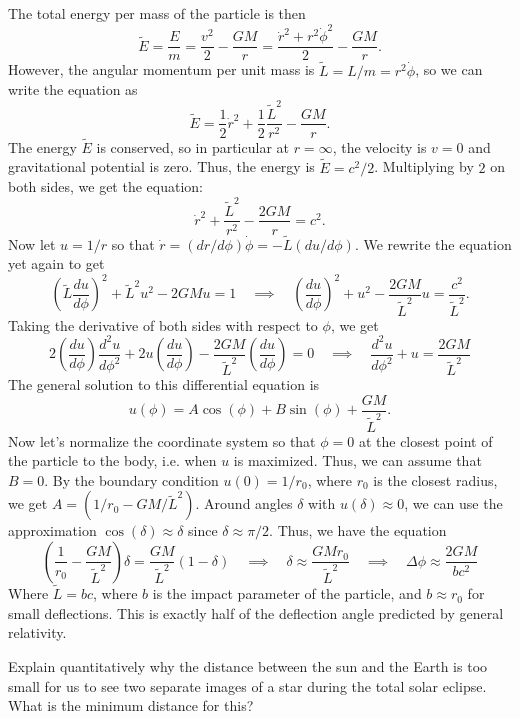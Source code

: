 \documentclass{../../templates/lkx_pset}
\begin{document}
\begin{solution}
  The total energy per mass of the particle is then 
  \[
    \widetilde{E} = \frac{E}{m} = \frac{v^2}{2} - \frac{GM}{r} = \frac{\dot{r}^2+ r^2\dot{\phi}^2}{2} - \frac{GM}{r}.
  \]
  However, the angular momentum per unit mass is $\widetilde{L} = L/m = r^2\dot{\phi}$, so we can write the equation as
  \[
    \widetilde{E} = \frac{1}{2}\dot{r}^2 + \frac{1}{2}\frac{\widetilde{L}^2}{r^2} - \frac{GM}{r}.
  \]
  The energy $\widetilde{E}$ is conserved, so in particular at $r=\infty$, the velocity is $v=0$ and gravitational potential is zero. Thus, the energy is $\widetilde{E}=c^2/2$. Multiplying by $2$ on both sides, we get the equation:
  \[
    \dot{r}^2 + \frac{\widetilde{L}^2}{r^2} - \frac{2GM}{r} = c^2.
  \]
  Now let $u=1/r$ so that $\dot{r} = (dr/d\phi)\dot{\phi} = -\widetilde{L}(du/d\phi)$. We rewrite the equation yet again to get
  \[
    \left(\widetilde{L}\frac{du}{d\phi}\right)^2 + \widetilde{L}^2u^2-2GMu = 1\quad\implies\quad
    \left(\frac{du}{d\phi}\right)^2 + u^2 - \frac{2GM}{\widetilde{L}^2}u = \frac{c^2}{\widetilde{L}^2}.
  \]
  Taking the derivative of both sides with respect to $\phi$, we get
  \[
    2\left(\frac{du}{d\phi}\right)\frac{d^2u}{d\phi^2} + 2u \left(\frac{du}{d\phi}\right) - \frac{2GM}{\widetilde{L}^2}\left(\frac{du}{d\phi}\right) = 0\quad\implies\quad \frac{d^2u}{d\phi^2} + u = \frac{2GM}{\widetilde{L}^2}
  \]
  The general solution to this differential equation is
  \[
    u(\phi) = A\cos(\phi) + B\sin(\phi) + \frac{GM}{\widetilde{L}^2}.
  \]
  Now let's normalize the coordinate system so that $\phi=0$ at the closest point of the particle to the body, i.e. when $u$ is maximized. Thus, we can assume that $B=0$. By the boundary condition $u(0) = 1/r_0$, where $r_0$ is the closest radius, we get $A = (1/r_0 - GM/\widetilde{L}^2)$. Around angles $\delta$ with $u(\delta)\approx 0$, we can use the approximation $\cos(\delta) \approx \delta$ since $\delta\approx \pi/2$. Thus, we have the equation
  \[
    \left(\frac{1}{r_0} - \frac{GM}{\widetilde{L}^2}\right)\delta = \frac{GM}{\widetilde{L}^2}(1-\delta) \quad\implies\quad \delta \approx \frac{GM r_0}{\widetilde{L}^2}\quad\implies\quad \Delta \phi \approx \frac{2GM}{bc^2}
  \]
  Where $\widetilde{L} = bc$, where $b$ is the impact parameter of the particle, and $b\approx r_0$ for small deflections. This is exactly half of the deflection angle predicted by general relativity.
\end{solution}

\begin{problem}{2}
  Explain quantitatively why the distance between the sun and the Earth is too small for us to see two separate images of a star during the total solar eclipse. What is the minimum distance for this?
\end{problem}
\end{document}
